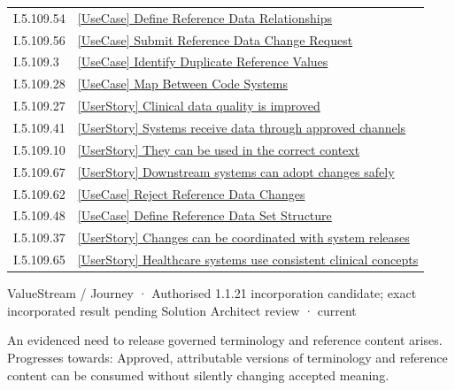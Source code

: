\begin{longtable}{p{.22\linewidth}p{.73\linewidth}}
I.5.109.54 & \hyperref[element:e1ee4ebeb09e451094fd9552dfdf50d7]{[UseCase] Define Reference Data Relationships} \\
I.5.109.56 & \hyperref[element:e22555d7c8554ee8b3be3f8e5928e43e]{[UseCase] Submit Reference Data Change Request} \\
I.5.109.3 & \hyperref[element:e5b00ab5cc344b9080ed4ad65d490f42]{[UseCase] Identify Duplicate Reference Values} \\
I.5.109.28 & \hyperref[element:eea72f086b4b487e87c2698469545dc1]{[UseCase] Map Between Code Systems} \\
I.5.109.27 & \hyperref[element:f060efd35e0547b4bd28fb09a96afd88]{[UserStory] Clinical data quality is improved} \\
I.5.109.41 & \hyperref[element:f0e22b6c4a344f8c884e3ce90c01d86e]{[UserStory] Systems receive data through approved channels} \\
I.5.109.10 & \hyperref[element:f1aa400cedae401b956d4258f61f5ead]{[UserStory] They can be used in the correct context} \\
I.5.109.67 & \hyperref[element:f4af9e9a51c440a5a05ccee8181a7837]{[UserStory] Downstream systems can adopt changes safely} \\
I.5.109.62 & \hyperref[element:f6e6e6d5f20d499097dd01d52739e103]{[UseCase] Reject Reference Data Changes} \\
I.5.109.48 & \hyperref[element:f9d6a6ffd3f6434a89f8ec1cd3aedd04]{[UseCase] Define Reference Data Set Structure} \\
I.5.109.37 & \hyperref[element:fa0c6928d2374c3f85631edc75831553]{[UserStory] Changes can be coordinated with system releases} \\
I.5.109.65 & \hyperref[element:fa7234dd52404a97b3c874a4148ad484]{[UserStory] Healthcare systems use consistent clinical concepts} \\
\end{longtable}
\label{element:e9a8a77c5f9c4361af4dfcfa607ece2d}
{\small ValueStream / Journey · Authorised 1.1.21 incorporation candidate; exact incorporated result pending Solution Architect review · current}\par

An evidenced need to release governed terminology and reference content arises. Progresses towards: Approved, attributable versions of terminology and reference content can be consumed without silently changing accepted meaning.



